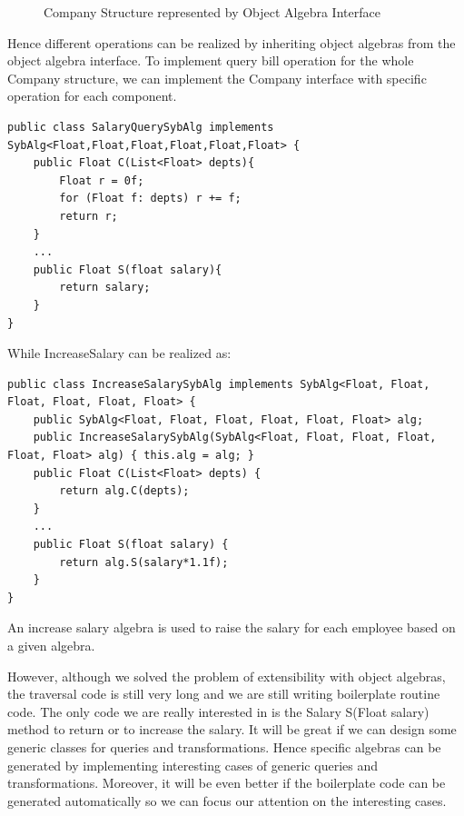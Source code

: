 \begin{figure}[tb]
\vspace{-.1in}
\caption{Company Structure represented by Object Algebra Interface}
\label{syb_tree}
\end{figure}

Hence different operations can be realized by inheriting object
algebras from the object algebra interface. To implement query bill
operation for the whole Company structure, we can implement the
Company interface with specific operation for each component.

\begin{lstlisting}[numbers=none] 
public class SalaryQuerySybAlg implements SybAlg<Float,Float,Float,Float,Float,Float> {
	public Float C(List<Float> depts){
		Float r = 0f;
		for (Float f: depts) r += f;
		return r;
	}
	...
	public Float S(float salary){
		return salary;
	}
}
\end{lstlisting}

While IncreaseSalary can be realized as: 

\begin{lstlisting}[numbers=none]
public class IncreaseSalarySybAlg implements SybAlg<Float, Float, Float, Float, Float, Float> {
	public SybAlg<Float, Float, Float, Float, Float, Float> alg;
	public IncreaseSalarySybAlg(SybAlg<Float, Float, Float, Float, Float, Float> alg) { this.alg = alg; }
	public Float C(List<Float> depts) {
		return alg.C(depts);
	}
	...
	public Float S(float salary) {
		return alg.S(salary*1.1f);
	}
}
\end{lstlisting}

An increase salary algebra is used to raise the salary for each employee based on a given algebra. 

However, although we solved the problem of extensibility with object
algebras, the traversal code is still very long and we are still
writing boilerplate routine code. The only code we are really interested in is the
Salary S(Float salary) method to return or to increase the salary. It
will be great if we can design some generic classes for queries and
transformations. Hence specific algebras can be generated by
implementing interesting cases of generic queries and
transformations. Moreover, it will be even better if the boilerplate
code can be generated automatically so we can focus our attention on
the interesting cases.

